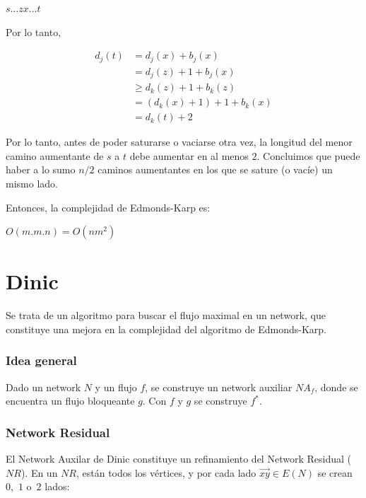 \documentclass[10pt,a4paper]{article}
\begin{document}
\begin{center}
$s\dots zx\dots t$
\end{center}

Por lo tanto,

\begin{center}
\begin{align*} d_j(t) &= d_j(x) + b_j(x)\\ &= d_j(z)+1+b_j(x)\\ &\geq d_k(z) + 1 + b_k(z)\\ &= (d_k(x)+1) + 1 + b_k(x)\\ &= d_k(t) + 2 \end{align*}
\end{center}

Por lo tanto, antes de poder saturarse o vaciarse otra vez, la longitud del menor camino aumentante de $s$ a $t$ debe aumentar en al menos $2$. Concluimos que puede haber a lo sumo $n/2$ caminos aumentantes en los que se sature (o vacíe) un mismo lado.

Entonces, la complejidad de Edmonds-Karp es:

\begin{center}
$O(m.m.n)=O(nm^2)$
\end{center}

\section*{Dinic}

Se trata de un algoritmo para buscar el flujo maximal en un network, que constituye una mejora en la complejidad del algoritmo de Edmonds-Karp.

\subsubsection*{Idea general}

Dado un network $N$ y un flujo $f$, se construye un network auxiliar $NA_f$, donde se encuentra un flujo bloqueante $g$. Con $f$ y $g$ se construye $f^*$.

\subsubsection*{Network Residual}

El Network Auxilar de Dinic constituye un refinamiento del Network Residual ($NR$). En un $NR$, están todos los vértices, y por cada lado $\overrightarrow{xy} \in E(N)$ se crean $0$, $1$ o $2$ lados:
\end{document}

